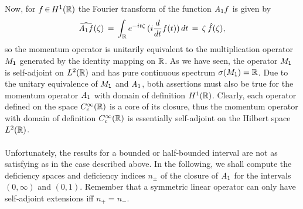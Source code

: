 \documentclass[11pt,twoside]{article}
\begin{document}
\subparagraph*{}
Now,
for $f {\,\in\,} H^1({\mathbb{R}})$
the Fourier transform of the function $\mathit{A}_1 f$ is given by
\[
\widehat{\mathit{A}_1 f}(\zeta) 
\,=\,
\int_{{\mathbb{R}}} e^{-it \zeta} \, (i \frac{d}{dt}f(t)) \, dt
\,=\,
\zeta \, \hat{f}(\zeta),
\]
so the momentum operator is unitarily equivalent to the multiplication
operator $M_{{\mathsf{1}}}$ generated by the identity mapping on ${\mathbb{R}}$.
As we have seen,
the operator $M_{{\mathsf{1}}}$ is self-adjoint on $L^2({\mathbb{R}})$ and has pure continuous
spectrum $\sigma(M_{{\mathsf{1}}})={\mathbb{R}}$.
Due to the unitary equivalence of $M_{{\mathsf{1}}}$ and $\mathit{A}_1$,
both assertions must also be true for the momentum operator $\mathit{A}_1$
with domain of definition $H^1({\mathbb{R}})$.
Clearly,
each operator defined on the space $C_c^{\infty}({\mathbb{R}})$ is a core of its closure,
thus the momentum operator with domain of definition $C_c^{\infty}({\mathbb{R}})$
is essentially self-adjoint on the Hilbert space $L^2({\mathbb{R}})$. 

\paragraph*{}
Unfortunately,
the results for a bounded or half-bounded interval are not as satisfying as
in the case described above.
In the following,
we shall compute the deficiency spaces and deficiency indices $n_{\pm}$
of the closure of $\mathit{A}_1$ for the intervals $(0,\infty)$ and $(0,1)$.
Remember
that a symmetric linear operator can only have self-adjoint extensions
iff $n_+=n_-$.
\end{document}
